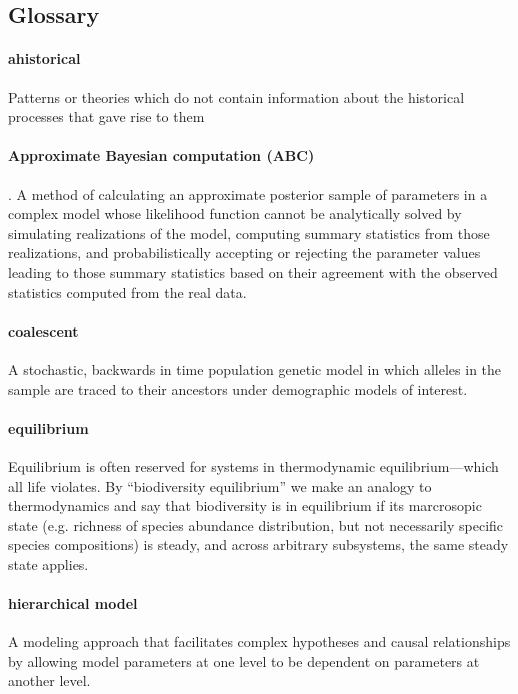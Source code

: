 \documentclass[12pt]{article}
\begin{document}
\subsection*{Glossary}

\paragraph{ahistorical} Patterns or theories which do not contain
information about the historical processes that gave rise to them

\paragraph{Approximate Bayesian computation (ABC)}. A method of
calculating an approximate posterior sample of parameters in a complex model
whose likelihood function cannot be analytically solved by simulating
realizations of the model, computing summary statistics from those
realizations, and probabilistically accepting or rejecting the
parameter values leading to those summary statistics based on their
agreement with the observed statistics computed from the real data.

\paragraph{coalescent} A stochastic, backwards in time population
genetic model in which alleles in the sample are traced to their
ancestors under demographic models of interest.

\paragraph{equilibrium} Equilibrium is often reserved for systems in
thermodynamic equilibrium---which all life violates.  By
``biodiversity equilibrium'' we make an analogy to thermodynamics and
say that biodiversity is in equilibrium if its marcrosopic state
(e.g. richness of species abundance distribution, but not necessarily
specific species compositions) is steady, and across arbitrary
subsystems, the same steady state applies.

\paragraph{hierarchical model} A modeling approach that facilitates
complex hypotheses and causal relationships by allowing model
parameters at one level to be dependent on parameters at another
level.
\end{document}
